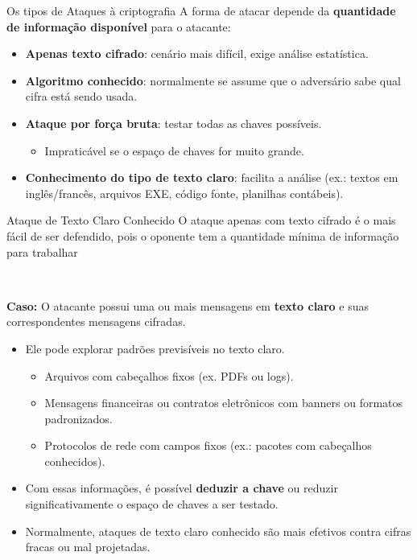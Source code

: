 \begin{frame}{Os tipos de Ataques à criptografia}
A forma de atacar depende da \textbf{quantidade de informação disponível} para o atacante:

\begin{itemize}
    \item \textbf{Apenas texto cifrado}: cenário mais difícil, exige análise estatística.  
    \item \textbf{Algoritmo conhecido}: normalmente se assume que o adversário sabe qual cifra está sendo usada.  
    \item \textbf{Ataque por força bruta}: testar todas as chaves possíveis.  
        \begin{itemize}
            \item Impraticável se o espaço de chaves for muito grande.  
        \end{itemize}
    \item \textbf{Conhecimento do tipo de texto claro}: facilita a análise (ex.: textos em inglês/francês, arquivos EXE, código fonte, planilhas contábeis).  
\end{itemize}
\end{frame}


\begin{frame}{Ataque de Texto Claro Conhecido }
O ataque apenas com texto cifrado é o mais fácil de ser defendido, pois o oponente tem a quantidade mínima de informação para trabalhar

\\
\hspace{1}

 \textbf{Caso:} O atacante possui uma ou mais mensagens em \textbf{texto claro} e suas correspondentes mensagens cifradas.
\begin{itemize}
    \item Ele pode explorar padrões previsíveis no texto claro.  
        \begin{itemize}
            \item Arquivos com cabeçalhos fixos (ex. PDFs ou logs).  
            \item Mensagens financeiras ou contratos eletrônicos com banners ou formatos padronizados.  
            \item Protocolos de rede com campos fixos (ex.: pacotes com cabeçalhos conhecidos).  
        \end{itemize}
    \item Com essas informações, é possível \textbf{deduzir a chave} ou reduzir significativamente o espaço de chaves a ser testado.  
    \item Normalmente, ataques de texto claro conhecido são mais efetivos contra cifras fracas ou mal projetadas.  
    \end{itemize}

\end{frame}

